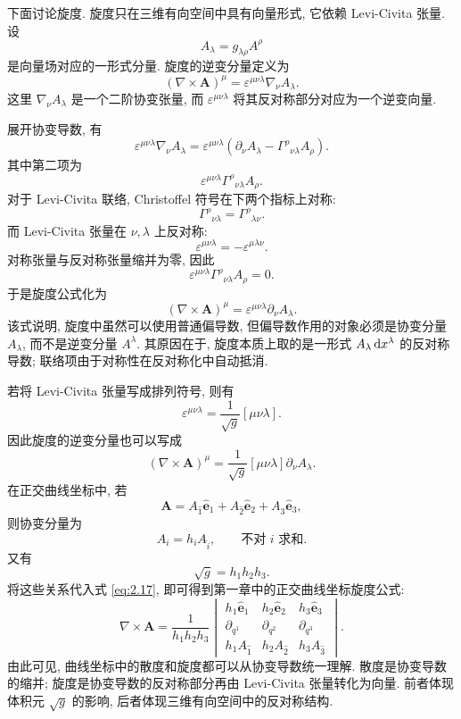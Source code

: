 下面讨论旋度. 旋度只在三维有向空间中具有向量形式, 它依赖 Levi-Civita 张量. 设
\[
A_{\lambda}
=
g_{\lambda\rho}A^{\rho}
\]
是向量场对应的一形式分量. 旋度的逆变分量定义为
\[
(\nabla\times\bm{A})^{\mu}
=
\varepsilon^{\mu\nu\lambda}\nabla_{\nu}A_{\lambda}.
\]
这里 $\nabla_{\nu}A_{\lambda}$ 是一个二阶协变张量, 而 $\varepsilon^{\mu\nu\lambda}$ 将其反对称部分对应为一个逆变向量. 

展开协变导数, 有
\[
\varepsilon^{\mu\nu\lambda}\nabla_{\nu}A_{\lambda}
=
\varepsilon^{\mu\nu\lambda}
\left(
\partial_{\nu}A_{\lambda}
-
\Gamma^{\rho}{}_{\nu\lambda}A_{\rho}
\right).
\]
其中第二项为
\[
\varepsilon^{\mu\nu\lambda}\Gamma^{\rho}{}_{\nu\lambda}A_{\rho}.
\]
对于 Levi-Civita 联络, Christoffel 符号在下两个指标上对称: 
\[
\Gamma^{\rho}{}_{\nu\lambda}
=
\Gamma^{\rho}{}_{\lambda\nu}.
\]
而 Levi-Civita 张量在 $\nu,\lambda$ 上反对称: 
\[
\varepsilon^{\mu\nu\lambda}
=
-\varepsilon^{\mu\lambda\nu}.
\]
对称张量与反对称张量缩并为零, 因此
\[
\varepsilon^{\mu\nu\lambda}\Gamma^{\rho}{}_{\nu\lambda}A_{\rho}
=
0.
\]
于是旋度公式化为
\begin{equation}
	(\nabla\times\bm{A})^{\mu}
	=
	\varepsilon^{\mu\nu\lambda}\partial_{\nu}A_{\lambda}.
	\label{eq:2.17}
\end{equation}
该式说明, 旋度中虽然可以使用普通偏导数, 但偏导数作用的对象必须是协变分量 $A_{\lambda}$, 而不是逆变分量 $A^{\lambda}$. 其原因在于, 旋度本质上取的是一形式 $A_{\lambda}\mathop{}\!\mathrm{d} x^{\lambda}$ 的反对称导数; 联络项由于对称性在反对称化中自动抵消. 

若将 Levi-Civita 张量写成排列符号, 则有
\[
\varepsilon^{\mu\nu\lambda}
=
\frac{1}{\sqrt{g}}[\mu\nu\lambda].
\]
因此旋度的逆变分量也可以写成
\[
(\nabla\times\bm{A})^{\mu}
=
\frac{1}{\sqrt{g}}[\mu\nu\lambda]\partial_{\nu}A_{\lambda}.
\]
在正交曲线坐标中, 若
\[
\bm{A}
=
A_{\hat{1}}\hat{\bm{e}}_{1}
+
A_{\hat{2}}\hat{\bm{e}}_{2}
+
A_{\hat{3}}\hat{\bm{e}}_{3},
\]
则协变分量为
\[
A_{i}
=
h_{i}A_{\hat{i}},
\qquad \text{不对 } i \text{ 求和}.
\]
又有
\[
\sqrt{g}=h_{1}h_{2}h_{3}.
\]
将这些关系代入式 \eqref{eq:2.17}, 即可得到第一章中的正交曲线坐标旋度公式: 
\[
\nabla\times\bm{A}
=
\frac{1}{h_{1}h_{2}h_{3}}
\begin{vmatrix}
	h_{1}\hat{\bm{e}}_{1} & h_{2}\hat{\bm{e}}_{2} & h_{3}\hat{\bm{e}}_{3}\\
	\partial_{q^{1}} & \partial_{q^{2}} & \partial_{q^{3}}\\
	h_{1}A_{\hat{1}} & h_{2}A_{\hat{2}} & h_{3}A_{\hat{3}}
\end{vmatrix}.
\]
由此可见, 曲线坐标中的散度和旋度都可以从协变导数统一理解. 散度是协变导数的缩并; 旋度是协变导数的反对称部分再由 Levi-Civita 张量转化为向量. 前者体现体积元 $\sqrt{g}$ 的影响, 后者体现三维有向空间中的反对称结构. 

